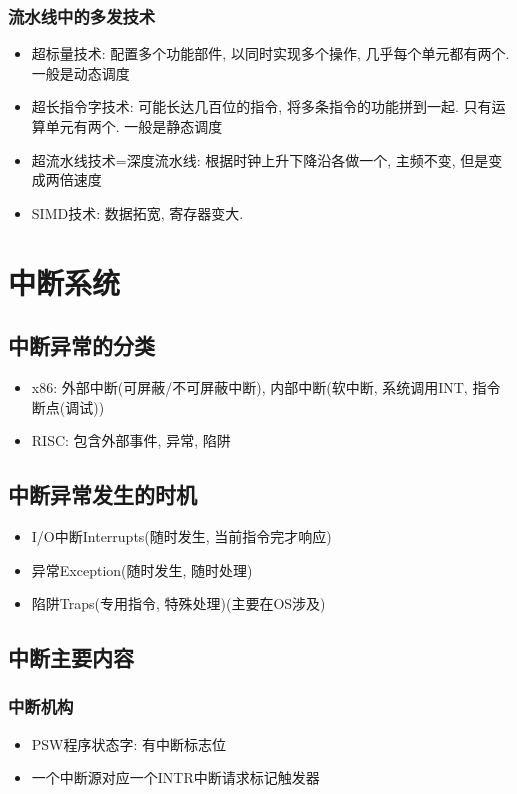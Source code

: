 \documentclass[UTF8]{article}
\begin{document}
\subsubsection{流水线中的多发技术}
\begin{itemize}
\item 超标量技术: 配置多个功能部件, 以同时实现多个操作, 几乎每个单元都有两个. 一般是动态调度
\item 超长指令字技术: 可能长达几百位的指令, 将多条指令的功能拼到一起. 只有运算单元有两个. 一般是静态调度
\item 超流水线技术=深度流水线: 根据时钟上升下降沿各做一个, 主频不变, 但是变成两倍速度
\item SIMD技术: 数据拓宽, 寄存器变大.
\end{itemize}

\section{中断系统}
\subsection{中断异常的分类}
\begin{itemize}
\item x86: 外部中断(可屏蔽/不可屏蔽中断), 内部中断(软中断, 系统调用INT, 指令断点(调试))
\item RISC: 包含外部事件, 异常, 陷阱
\end{itemize}
\subsection{中断异常发生的时机}
\begin{itemize}
\item I/O中断Interrupts(随时发生, 当前指令完才响应)
\item 异常Exception(随时发生, 随时处理)
\item 陷阱Traps(专用指令, 特殊处理)(主要在OS涉及)
\end{itemize}
\subsection{中断主要内容}
\subsubsection{中断机构}
\begin{itemize}
\item PSW程序状态字: 有中断标志位
\item 一个中断源对应一个INTR中断请求标记触发器
\end{itemize}
\end{document}
